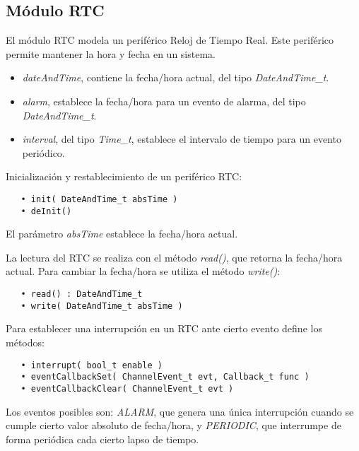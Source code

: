 \subsection{Módulo RTC}

El módulo RTC modela un periférico Reloj de Tiempo Real. Este periférico permite mantener la hora y fecha en un sistema.


\begin{itemize}
\item
\emph{dateAndTime}, contiene la fecha/hora actual, del tipo \emph{DateAndTime\_t}.
\item
\emph{alarm}, establece la fecha/hora para un evento de alarma, del tipo \emph{DateAndTime\_t}.
\item
\emph{interval}, del tipo \emph{Time\_t}, establece el intervalo de tiempo para un evento periódico.
\end{itemize}


Inicialización y restablecimiento de un periférico RTC:

\begin{verbatim}
   • init( DateAndTime_t absTime )
   • deInit()
\end{verbatim}

El parámetro \emph{absTime} establece la fecha/hora actual. 

La lectura del RTC se realiza con el método \emph{read()}, que retorna la fecha/hora actual. Para cambiar la fecha/hora se utiliza el método \emph{write()}:

\begin{verbatim}
   • read() : DateAndTime_t
   • write( DateAndTime_t absTime )
\end{verbatim}

Para establecer una interrupción en un RTC ante cierto evento define los métodos: 

\begin{verbatim}
   • interrupt( bool_t enable )
   • eventCallbackSet( ChannelEvent_t evt, Callback_t func )
   • eventCallbackClear( ChannelEvent_t evt )
\end{verbatim}

Los eventos posibles son: \emph{ALARM}, que genera una única interrupción cuando se cumple cierto valor absoluto de fecha/hora, y \emph{PERIODIC}, que interrumpe de forma periódica cada cierto lapso de tiempo.
